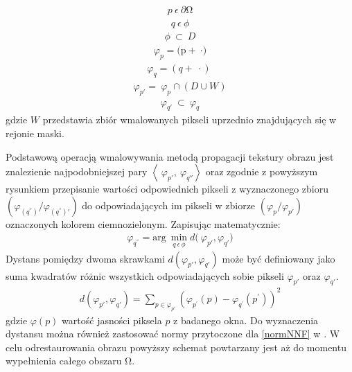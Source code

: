 \documentclass[12pt, twoside, openany]{report}
\theoremstyle{definition}
\begin{document}
\begin{align}
p\ \epsilon \ \partial \mathrm{\Omega }
\end{align}
\begin{align}
q\ \epsilon \mathrm{\ }\phi 
\end{align}
\begin{align}
\phi \ \subset \ D
\end{align}
\begin{align}
{\varphi }_p=\mathrm{(p+\ }\mathrm{\cdot }\mathrm{)}
\end{align}
\begin{align}
{\varphi }_q=(q+\ \cdot )\ 
\end{align}
\begin{align}
{\varphi }_{p'}=\ {\varphi }_p\cap (D\cup W) 
\end{align}
\begin{align}
{\varphi }_{q'}\ \subset \ {\varphi }_q
\end{align}
gdzie $W$ przedstawia zbiór wmalowanych pikseli uprzednio znajdujących się w rejonie maski.
\par
Podstawową operacją wmalowywania metodą propagacji tekstury obrazu jest znalezienie najpodobniejszej pary $\left\langle {\ \varphi }_{p'},\ {\varphi }_{q''}\right\rangle $ oraz zgodnie z powyższym rysunkiem przepisanie wartości odpowiednich pikseli z wyznaczonego zbioru $({\varphi }_{(q^{''})}/{\varphi }_{(q^{''})'})$ do odpowiadających im pikseli w zbiorze $({\varphi }_p/{\varphi }_{p'})$ oznaczonych kolorem ciemnozielonym. Zapisując matematycznie:
\begin{align}
{\varphi }_{q^{''}}={\mathrm{arg}\ \mathop{\mathrm{min}}_{q\ \epsilon \mathrm{\ }\phi } d(\ }{\varphi }_{p'},{\varphi }_{q'})
\label{FROBDIST}
\end{align}
Dystans pomiędzy dwoma skrawkami $d({\varphi }_{p'},{\varphi }_{q'})$ może być definiowany jako suma kwadratów różnic wszystkich odpowiadających sobie pikseli ${\varphi }_{p'}$ oraz ${\varphi }_{q'}$.
\begin{align}
d(\varphi_{p'},\varphi_{q'})= \sum_{p\in \varphi_{p'}} \left( \varphi_{p^{'}}(p) - \varphi _{q^{'}} \left(p^{'}\right) \right)^2
\label{FROBENIUS2} 
\end{align}
gdzie $\varphi \left(p\right)$ wartość jasności piksela $p$ z badanego okna. Do wyznaczenia dystansu można również zastosować normy przytoczone dla \eqref{normNNF} w \cite{MathematicalModelsforNLTextureInpainting}. W celu odrestaurowania obrazu powyższy schemat powtarzany jest aż do momentu wypełnienia całego obszaru $\mathrm{\Omega }$.
\end{document}
